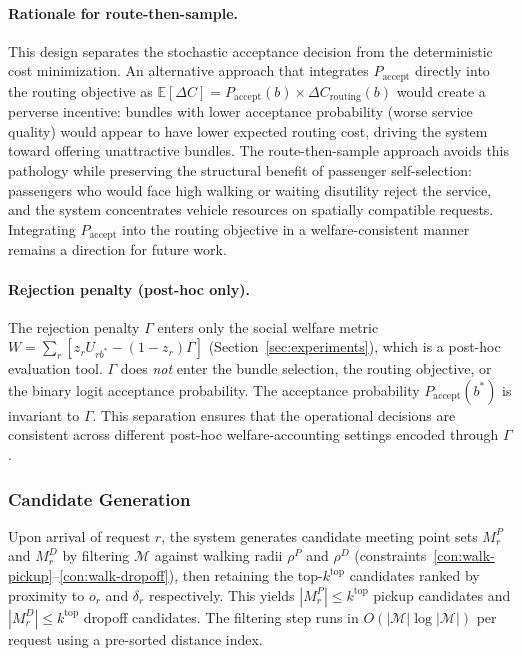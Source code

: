 \paragraph{Rationale for route-then-sample.}
This design separates the stochastic acceptance decision from the deterministic
cost minimization. An alternative approach that integrates $P_{\text{accept}}$
directly into the routing objective as $\mathbb{E}[\Delta C] = P_{\text{accept}}(b)
\times \Delta C_{\text{routing}}(b)$ would create a perverse incentive: bundles with
lower acceptance probability (worse service quality) would appear to have lower
expected routing cost, driving the system toward offering unattractive bundles.
The route-then-sample approach avoids this pathology while preserving the structural
benefit of passenger self-selection: passengers who would face high walking or
waiting disutility reject the service, and the system concentrates vehicle resources
on spatially compatible requests. Integrating $P_{\text{accept}}$ into the routing
objective in a welfare-consistent manner remains a direction for future work.

\paragraph{Rejection penalty (post-hoc only).}
The rejection penalty $\Gamma$ enters only the social welfare metric
$W = \sum_r [z_r U_{rb^*} - (1-z_r)\Gamma]$ (Section~\ref{sec:experiments}),
which is a post-hoc evaluation tool. $\Gamma$ does \emph{not} enter the bundle
selection, the routing objective, or the binary logit acceptance probability.
The acceptance probability $P_{\text{accept}}(b^*)$ is invariant to $\Gamma$.
This separation ensures that the operational decisions are consistent across
different post-hoc welfare-accounting settings encoded through $\Gamma$.

\subsubsection{Candidate Generation}

Upon arrival of request $r$, the system generates candidate meeting point sets $M_r^P$
and $M_r^D$ by filtering $\mathcal{M}$ against walking radii $\rho^P$ and $\rho^D$
(constraints~\ref{con:walk-pickup}--\ref{con:walk-dropoff}), then retaining the
top-$k^{\text{top}}$ candidates ranked by proximity to $o_r$ and $\delta_r$ respectively.
This yields $|M_r^P| \leq k^{\text{top}}$ pickup candidates and
$|M_r^D| \leq k^{\text{top}}$ dropoff candidates. The filtering step runs in
$O(|\mathcal{M}| \log |\mathcal{M}|)$ per request using a pre-sorted distance index.

